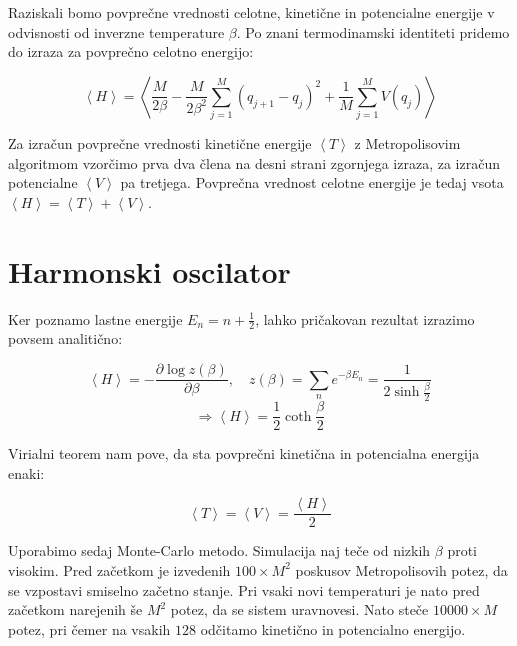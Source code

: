 \documentclass[a4paper]{article}
\newcommand{\pder}[2]{\frac{\partial#1}{\partial#2}}
\newcommand{\half}{\frac{1}{2}}
\newcommand{\expected}[1]{\left\langle #1 \right\rangle}
\begin{document}
    Raziskali bomo povprečne vrednosti celotne, kinetične in potencialne energije v odvisnosti od inverzne temperature
    $\beta$.
    Po znani termodinamski identiteti pridemo do izraza za povprečno celotno energijo:

    \begin{equation}\label{eq5}
        \expected{H} = \expected{\frac{M}{2\beta} - \frac{M}{2\beta^2}\sum_{j=1}^M (q_{j+1} - q_j)^2
                                + \frac{1}{M}\sum_{j=1}^M V(q_j)}
    \end{equation}

    Za izračun povprečne vrednosti kinetične energije $\expected{T}$ z Metropolisovim algoritmom vzorčimo prva dva člena
    na desni strani zgornjega izraza, za izračun potencialne $\expected{V}$ pa tretjega.
    Povprečna vrednost celotne energije je tedaj vsota $\expected{H} = \expected{T} + \expected{V}$.

    \section{Harmonski oscilator}

    Ker poznamo lastne energije $E_n = n + \half$, lahko pričakovan rezultat izrazimo povsem analitično:

    \begin{equation}\label{eq6}
        \expected{H} = -\pder{\log{z(\beta)}}{\beta}, \quad
        z(\beta) = \sum_n e^{-\beta E_n} = \frac{1}{2 \sinh{\frac{\beta}{2}}}
    \end{equation}
    \begin{equation}\label{eq7}
        \Rightarrow \expected{H} = \half \coth{\frac{\beta}{2}}
    \end{equation}

    Virialni teorem nam pove, da sta povprečni kinetična in potencialna energija enaki:

    \begin{equation}\label{eq8}
        \expected{T} = \expected{V} = \frac{\expected{H}}{2}
    \end{equation}

    Uporabimo sedaj Monte-Carlo metodo.
    Simulacija naj teče od nizkih $\beta$ proti visokim.
    Pred začetkom je izvedenih $100 \times M^2$ poskusov Metropolisovih potez, da se vzpostavi smiselno začetno stanje.
    Pri vsaki novi temperaturi je nato pred začetkom narejenih še $M^2$ potez, da se sistem uravnovesi.
    Nato steče $10000 \times M$ potez, pri čemer na vsakih $128$ odčitamo kinetično in potencialno energijo. \\
\end{document}
